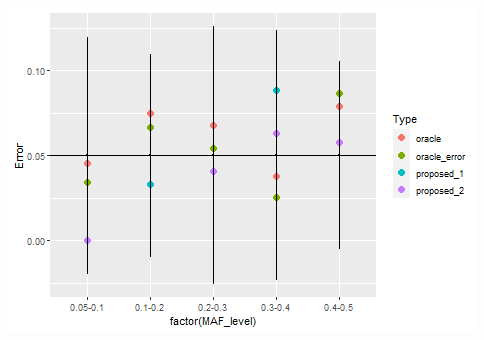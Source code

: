 \documentclass[
]{article}
\newenvironment{Shaded}{\begin{snugshade}}{\end{snugshade}}
\newcommand{\DataTypeTok}[1]{\textcolor[rgb]{0.13,0.29,0.53}{#1}}
\newcommand{\DecValTok}[1]{\textcolor[rgb]{0.00,0.00,0.81}{#1}}
\newcommand{\FloatTok}[1]{\textcolor[rgb]{0.00,0.00,0.81}{#1}}
\newcommand{\KeywordTok}[1]{\textcolor[rgb]{0.13,0.29,0.53}{\textbf{#1}}}
\newcommand{\NormalTok}[1]{#1}
\newcommand{\OperatorTok}[1]{\textcolor[rgb]{0.81,0.36,0.00}{\textbf{#1}}}
\newcommand{\StringTok}[1]{\textcolor[rgb]{0.31,0.60,0.02}{#1}}
\begin{document}
\begin{Shaded}
\begin{Highlighting}[]
{{\NormalTok{all_error <-}\StringTok{ }\NormalTok{all_error }\OperatorTok{%

\NormalTok{all_error }\OperatorTok{%
\end{Highlighting}
\end{Shaded}

\includegraphics{stats-gene-research-progress-v8_files/figure-latex/unnamed-chunk-11-1.png}
\end{document}
